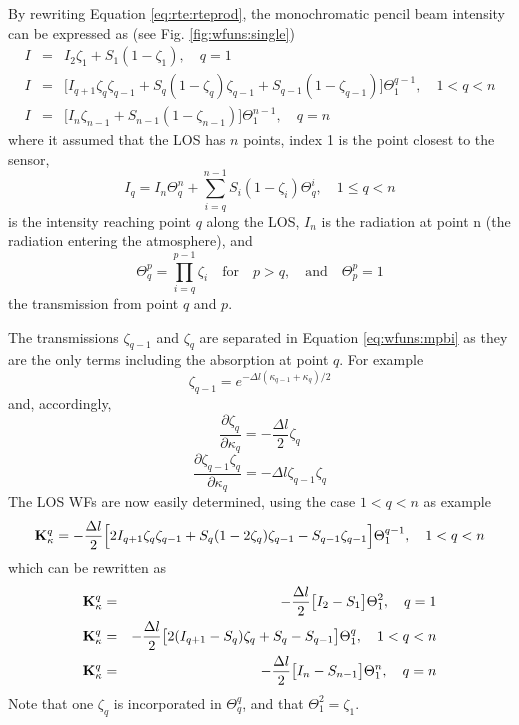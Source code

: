  By rewriting Equation \ref{eq:rte:rteprod}, the monochromatic pencil beam
 intensity can be expressed as (see Fig. \ref{fig:wfuns:single})
 \begin{eqnarray}
   I &=& I_2\zeta_1+S_1(1-\zeta_1), \quad q=1 
     \nonumber \\
   I &=&\Big[I_{q+1}\zeta_q\zeta_{q-1}+S_q(1-\zeta_q)\zeta_{q-1} +
            S_{q-1}(1-\zeta_{q-1}) \Big] \Theta^{q-1}_1, \quad 1<q<n 
    \label{eq:wfuns:mpbi} \\
   I &=& \Big[I_n\zeta_{n-1}+S_{n-1}(1-\zeta_{n-1})\Big]\Theta^{n-1}_{1}, \quad q=n
     \nonumber
 \end{eqnarray}
 where it assumed that the LOS has $n$ points, index 1 is the point
 closest to the sensor,
 \begin{equation}
   I_q = I_n \Theta^{n}_{q} + \sum_{i=q}^{n-1}S_i(1-\zeta_i) 
             \Theta_{q}^{i}, \quad 1 \leq q < n
  \label{eq:wfuns:iq}
 \end{equation}
 is the intensity reaching point $q$ along the LOS, $I_n$ is the radiation at
 point n (the radiation entering the atmosphere), and
 \begin{equation}
   \Theta_q^p = \prod_{i=q}^{p-1}\zeta_i\quad \mathrm{for} \quad p>q, 
     \quad \mathrm{and} \quad \Theta_p^p = 1
  \label{eq:wfuns:Theta}
 \end{equation}
 the transmission from point $q$ and $p$. 

 The transmissions $\zeta_{q-1}$ and $\zeta_q$ are separated in Equation
 \ref{eq:wfuns:mpbi} as they are the only terms including the absorption
 at point $q$. For example
 \begin{equation}
   \zeta_{q-1} = e^{-\Delta l(\kappa_{q-1}+\kappa_q)/2}
 \end{equation}
 and, accordingly,
 \begin{equation}
   \frac{\partial \zeta_q}{\partial \kappa_q} = -\frac{\Delta l}{2}\zeta_q
  \label{eq:wfuns:dzeta1}
 \end{equation}
 \begin{equation}
   \frac{\partial \zeta_{q-1}\zeta_q}{\partial \kappa_q} = 
          -\Delta l \zeta_{q-1}\zeta_q
  \label{eq:wfuns:dzeta2}
 \end{equation}
 The LOS WFs are now easily determined, using the case $1<q<n$ as example
 \begin{equation}
   \mathbf{K}_{\kappa}^q = -\frac{\Delta l}{2} \Big[ 2I_{q+1}\zeta_q\zeta_{q-1}+
     S_q(1-2\zeta_q)\zeta_{q-1} - S_{q-1}\zeta_{q-1} \Big] \Theta^{q-1}_1, 
     \quad 1<q<n
 \end{equation}
 which can be rewritten as
 \begin{eqnarray}
   \mathbf{K}_{\kappa}^q &=& -\frac{\Delta l}{2} \big[ I_2-S_1 \big] \Theta^2_1, \quad q=1 \nonumber \\
   \mathbf{K}_{\kappa}^q &=& -\frac{\Delta l}{2} \big[ 2(I_{q+1}-S_q)\zeta_q+
           S_q-S_{q-1} \big] \Theta^q_1, \quad 1<q<n 
  \label{eq:wfuns:loswfsxx} \\
   \mathbf{K}_{\kappa}^q &=& -\frac{\Delta l}{2} \big[ I_n-S_{n-1} \big] \Theta^n_1, \quad q=n \nonumber
 \end{eqnarray}
 Note that one $\zeta_q$ is incorporated in $\Theta^q_q$, and that 
 $\Theta^2_1=\zeta_1$.
 
